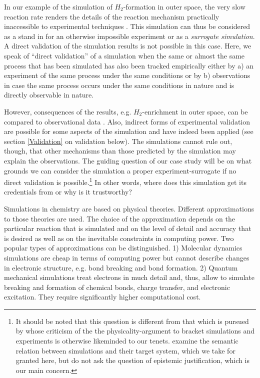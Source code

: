\documentclass[12pt, a4paper]{article}
\numberwithin{equation}{section}
\begin{document}
In our example of the simulation of $H_2$-formation in outer space,
the very slow reaction rate renders the details of the reaction
mechanism practically inaccessible to experimental techniques \cite[p.
7351]{goumans-kaestner:2010}. This simulation can thus be considered
as a stand in for an otherwise impossible experiment or as a
\emph{surrogate simulation}. A direct validation of the simulation
results is not possible in this case. Here, we speak of ``direct
validation'' of a simulation when the same or almost the same process
that has been simulated has also been tracked empirically either by a)
an experiment of the same process under the same conditions or by b)
observations in case the same process occurs under the same conditions
in nature and is directly observable in nature.


However, consequences of the results, e.g. $H_2$-enrichment in outer
space, can be compared to observational data
\cite[p. 7351f.]{goumans-kaestner:2010}. Also, indirect forms of
experimental validation are possible for some aspects of the
simulation and have indeed been applied (see section \ref{Validation}
on validation below). The simulations cannot rule out, though, that
other mechanisms than those predicted by the simulation may explain
the observations. The guiding question of our case study will be on
what grounds we can consider the simulation a proper
experiment-surrogate if no direct validation is possible.\footnote{It
  should be noted that this question is different from that which is
  pursued by \citet{barberousse-et-al:2009} whose criticism of the the
  physicality-argument to bracket simulations and experiments is
  otherwise likeminded to our tenets. \cite{barberousse-et-al:2009}
  examine the semantic relation between simulations and their target
  system, which we take for granted here, but do not ask the question
  of epistemic justification, which is our main concern.} In other
words, where does this simulation get its credentials from or why is
it trustworthy?

Simulations in chemistry are based on physical theories. Different
approximations to those theories are used. The choice of the
approximation depends on the particular reaction that is simulated and
on the level of detail and accuracy that is desired as well as on the
inevitable constraints in computing power. Two popular types of
approximations can be distinguished. 1) Molecular dynamics simulations
are cheap in terms of computing power but cannot describe changes in
electronic structure, e.g. bond breaking and bond formation. 2)
Quantum mechanical simulations treat electrons in much detail and,
thus, allow to simulate breaking and formation of chemical bonds,
charge transfer, and electronic excitation. They require significantly
higher computational cost.
\end{document}
